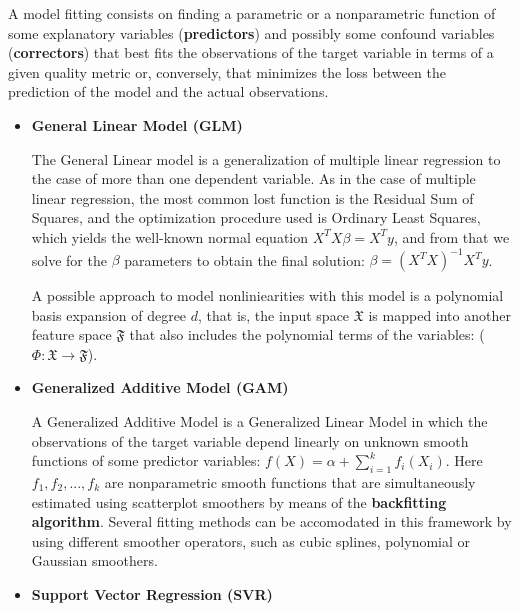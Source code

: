 \documentclass{article}
\begin{document}
A model fitting consists on finding a parametric or a nonparametric function of some explanatory variables (\textbf{predictors}) and possibly some confound variables (\textbf{correctors}) that best fits the observations of the target variable in terms of a given quality metric or, conversely, that minimizes the loss between the prediction of the model and the actual observations.
\begin{itemize}
\item \textbf{General Linear Model (GLM)} 

The General Linear model is a generalization of multiple linear regression to the case of more than one dependent variable. As in the case of multiple linear regression, the most common lost function is the Residual Sum of Squares, and the optimization procedure used is Ordinary Least Squares, which yields the well-known normal equation $ X^TX\beta = X^Ty $, and from that we solve for the $\beta$ parameters to obtain the final solution: $ \beta = (X^TX)^{-1}X^Ty $.

A possible approach to model nonliniearities with this model is a polynomial basis expansion of degree $d$, that is, the input space $\mathfrak{X}$ is mapped into another feature space $\mathfrak{F}$ that also includes the polynomial terms of the variables: ($\Phi : \mathfrak{X} \rightarrow \mathfrak{F}$).

\item \textbf{Generalized Additive Model (GAM)} 

A Generalized Additive Model is a Generalized Linear Model in which the observations of the target variable depend linearly on unknown smooth functions of some predictor variables: $ f(X) = \alpha + \sum_{i=1}^{k} f_i(X_i)$. Here $f_1, f_2, ..., f_k$ are nonparametric smooth functions that are simultaneously estimated using scatterplot smoothers by means of the \textbf{backfitting algorithm}. Several fitting methods can be accomodated in this framework by using different smoother operators, such as cubic splines, polynomial or Gaussian smoothers. 

\item \textbf{Support Vector Regression (SVR)} 


\end{itemize}
\end{document}
